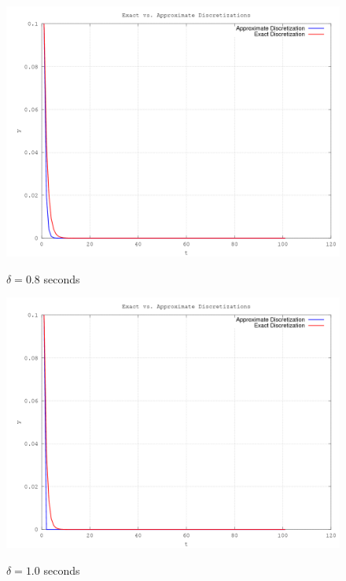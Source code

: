\documentclass[10pt,a4paper]{article}
\begin{document}
\begin{center}
	\begin{figure}[H]
			  \includegraphics[scale=0.5]{figures/Question5Delta08.png} 
	          \label{fig:Q5Delta5}
	\caption{ $\delta = 0.8$  seconds}
	\end{figure}

	\begin{figure}[H]
			  \includegraphics[scale=0.5]{figures/Question5Delta1.png} 
	          \label{fig:Q5Delta6}
	\caption{ $\delta = 1.0$  seconds}
	\end{figure}	
\end{center}	
\end{document}
